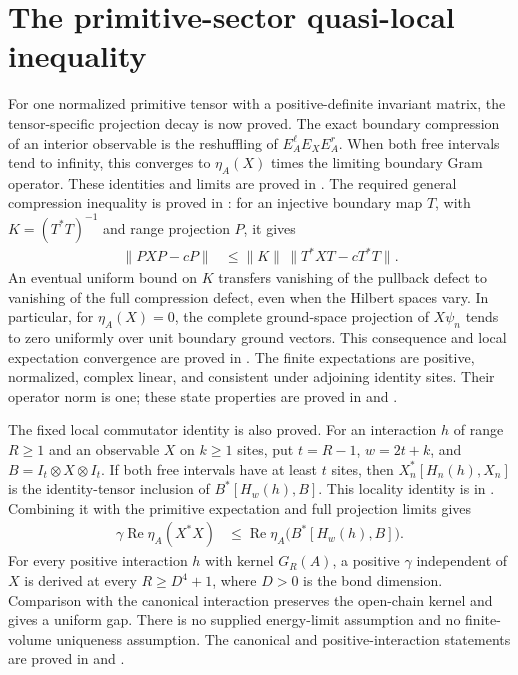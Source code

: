 \documentclass{article}
\begin{document}
\section{The primitive-sector quasi-local inequality}
For one normalized primitive tensor with a positive-definite invariant
matrix, the tensor-specific projection decay is now proved. The exact
boundary compression of an interior observable is the reshuffling of
$E_A^\ell E_X E_A^r$. When both free intervals tend to infinity, this
converges to $\eta_A(X)$ times the limiting boundary Gram operator.
These identities and limits are proved in
.
The required general compression inequality is proved in
:
for an injective boundary map $T$, with $K=(T^*T)^{-1}$ and range
projection $P$, it gives
\begin{align}
    \|PXP-cP\|&\leq\|K\|\,\|T^*XT-cT^*T\|.
    \label{eq:infinite_gap_compression_bound}
\end{align}
An eventual uniform bound on $K$ transfers vanishing of the pullback defect
to vanishing of the full compression defect, even when the Hilbert spaces
vary. In particular, for $\eta_A(X)=0$, the complete ground-space projection
of $X\psi_n$ tends to zero uniformly over unit boundary ground vectors.
This consequence and local expectation convergence are proved in
.
The finite expectations are positive, normalized, complex linear, and
consistent under adjoining identity sites. Their operator norm is one;
these state properties are proved in
 and
.

The fixed local commutator identity is also proved. For an interaction $h$
of range $R\geq1$ and an observable $X$ on $k\geq1$ sites, put
$t=R-1$, $w=2t+k$, and $B=I_t\otimes X\otimes I_t$. If both free
intervals have at least $t$ sites, then $X_n^*[H_n(h),X_n]$ is the
identity-tensor inclusion of $B^*[H_w(h),B]$. This locality identity is in
.
Combining it with the primitive expectation and full projection limits gives
\begin{align}
    \gamma\operatorname{Re}\eta_A(X^*X)
        &\leq\operatorname{Re}\eta_A\bigl(B^*[H_w(h),B]\bigr).
    \label{eq:primitive_local_commutator_gap}
\end{align}
For every positive interaction $h$ with kernel $G_R(A)$, a positive
$\gamma$ independent of $X$ is derived at every $R\geq D^4+1$, where
$D>0$ is the bond dimension. Comparison with the canonical interaction
preserves the open-chain kernel and gives a uniform gap. There is no
supplied energy-limit assumption and no finite-volume uniqueness assumption.
The canonical and positive-interaction statements are proved in
 and
.
\end{document}
